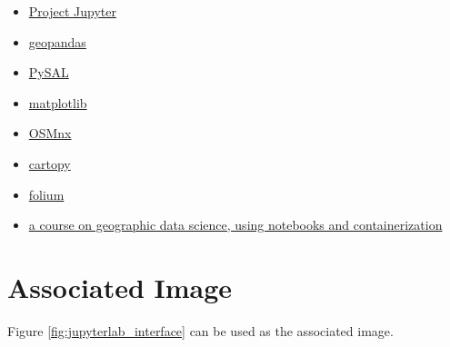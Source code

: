 \documentclass[11pt,letterpaper]{article}
\begin{document}
\begin{itemize}
    \item \href{https://jupyter.org/}{Project Jupyter}
    \item \href{https://geopandas.org/}{geopandas}
    \item \href{https://pysal.org/}{PySAL}
    \item \href{https://matplotlib.org/}{matplotlib}
    \item \href{https://osmnx.readthedocs.io/}{OSMnx}
    \item \href{https://scitools.org.uk/cartopy/docs/latest/}{cartopy}
    \item \href{https://python-visualization.github.io/folium/}{folium}
    \item \href{https://doi.org/10.5281/zenodo.1135210}{a course on geographic data science, using notebooks and containerization}
\end{itemize}

\section*{Associated Image}

Figure \ref{fig:jupyterlab_interface} can be used as the associated image.
\end{document}
